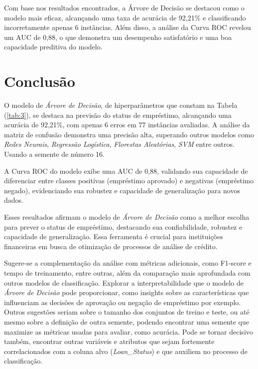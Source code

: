 \documentclass[a4paper,12pt]{article} %
\begin{document}
Com base nos resultados encontrados, a Árvore de Decisão se destacou como o modelo mais eficaz, alcançando uma taxa de acurácia de 92,21\% e classificando incorretamente apenas 6 instâncias. Além disso, a análise da Curva ROC revelou um AUC de 0,88, o que demonstra um desempenho satisfatório e uma boa capacidade preditiva do modelo.

\section{Conclusão}
O modelo de \textit{Árvore de Decisão}, de hiperparâmetros que constam na Tabela (\ref{tab:3}), se destaca na previsão do status de empréstimo, alcançando uma acurácia de 92,21\%, com apenas 6 erros em 77 instâncias avaliadas. A análise da matriz de confusão demonstra uma precisão alta, superando outros modelos como \textit{Redes Neurais}, \textit{Regressão Logística}, \textit{Florestas Aleatórias}, \textit{SVM} entre outros. Usando a semente de número 16.

A Curva ROC do modelo exibe uma AUC de 0,88, validando sua capacidade de diferenciar entre classes positivas (empréstimo aprovado) e negativas (empréstimo negado), evidenciando sua robustez e capacidade de generalização para novos dados.

Esses resultados afirmam o modelo de \textit{Árvore de Decisão} como a melhor escolha para prever o status de empréstimo, destacando sua confiabilidade, robustez e capacidade de generalização. Essa ferramenta é crucial para instituições financeiras em busca de otimização de processos de análise de crédito.

Sugere-se a complementação da análise com métricas adicionais, como F1-score e tempo de treinamento, entre outras, além da comparação mais aprofundada com outros modelos de classificação. Explorar a interpretabilidade que o modelo de \textit{Árvore de Decisão} pode proporcionar, como insights sobre as características que influenciam as decisões de aprovação ou negação de empréstimo por exemplo. Outros sugestões seriam sobre o tamanho dos conjuntos de treino e teste, ou até mesmo sobre a definição de outra semente, podendo encontrar uma semente que maximize as métricas usadas para avaliar, como acurácia. Pode se tornar decisivo também, encontrar outras variáveis e atributos que sejam fortemente correlacionados com a coluna alvo (\textit{Loan\_Status}) e que auxiliem no processo de classificação.

\newpage


\end{document}

